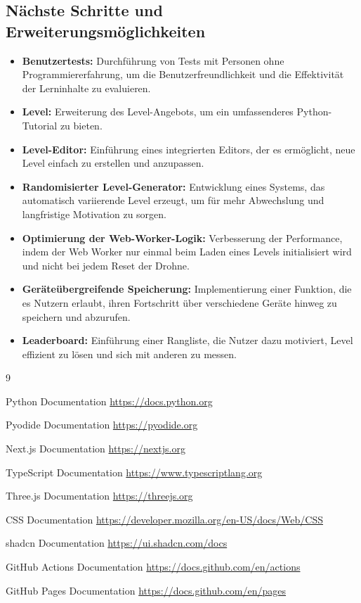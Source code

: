 \documentclass[a4paper,12pt]{article}
\begin{document}
	\newpage
	\subsection{Nächste Schritte und Erweiterungsmöglichkeiten}
	\begin{itemize}
		\item \textbf{Benutzertests:} Durchführung von Tests mit Personen ohne Programmiererfahrung, um die Benutzerfreundlichkeit und die Effektivität der Lerninhalte zu evaluieren.

		\item \textbf{Level:} Erweiterung des Level-Angebots, um ein umfassenderes Python-Tutorial zu bieten.
	
		\item \textbf{Level-Editor:} Einführung eines integrierten Editors, der es ermöglicht, neue Level einfach zu erstellen und anzupassen.
		
		\item \textbf{Randomisierter Level-Generator:} Entwicklung eines Systems, das automatisch variierende Level erzeugt, um für mehr Abwechslung und langfristige Motivation zu sorgen.
		
		\item \textbf{Optimierung der Web-Worker-Logik:} Verbesserung der Performance, indem der Web Worker nur einmal beim Laden eines Levels initialisiert wird und nicht bei jedem Reset der Drohne.
		
		\item \textbf{Geräteübergreifende Speicherung:} Implementierung einer Funktion, die es Nutzern erlaubt, ihren Fortschritt über verschiedene Geräte hinweg zu speichern und abzurufen.
		
		\item \textbf{Leaderboard:} Einführung einer Rangliste, die Nutzer dazu motiviert, Level effizient zu lösen und sich mit anderen zu messen.
	\end{itemize}
	\newpage

	\begin{thebibliography}{9}

	Python Documentation
	\url{https://docs.python.org}

	Pyodide Documentation
	\url{https://pyodide.org}

	Next.js Documentation
	\url{https://nextjs.org}

	TypeScript Documentation
	\url{https://www.typescriptlang.org}

	Three.js Documentation
	\url{https://threejs.org}

	CSS Documentation
	\url{https://developer.mozilla.org/en-US/docs/Web/CSS}

	shadcn Documentation
	\url{https://ui.shadcn.com/docs}

	GitHub Actions Documentation
	\url{https://docs.github.com/en/actions}

	GitHub Pages Documentation
	\url{https://docs.github.com/en/pages}

	\end{thebibliography}	
\end{document}
